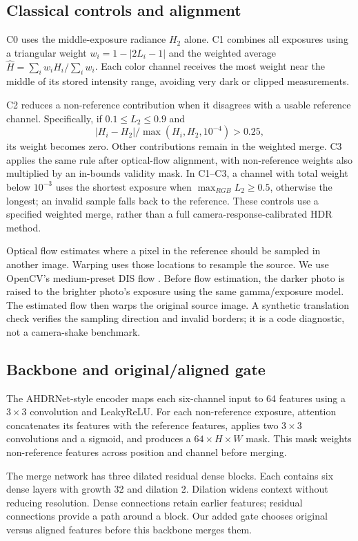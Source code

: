 \documentclass{article}
\begin{document}
\subsection{Classical controls and alignment}
C0 uses the middle-exposure radiance $H_2$ alone. C1 combines all exposures using a triangular weight $w_i=1-|2L_i-1|$ and the weighted average $\widehat H=\sum_i w_iH_i/\sum_i w_i$. Each color channel receives the most weight near the middle of its stored intensity range, avoiding very dark or clipped measurements.

C2 reduces a non-reference contribution when it disagrees with a usable reference channel. Specifically, if $0.1\leq L_2\leq0.9$ and
\begin{equation}
|H_i-H_2|/\max(H_i,H_2,10^{-4})>0.25,
\end{equation}
its weight becomes zero. Other contributions remain in the weighted merge. C3 applies the same rule after optical-flow alignment, with non-reference weights also multiplied by an in-bounds validity mask. In C1--C3, a channel with total weight below $10^{-3}$ uses the shortest exposure when $\max_{RGB}L_2\geq0.5$, otherwise the longest; an invalid sample falls back to the reference. These controls use a specified weighted merge, rather than a full camera-response-calibrated HDR method.

Optical flow estimates where a pixel in the reference should be sampled in another image. Warping uses those locations to resample the source. We use OpenCV's medium-preset DIS flow \citep{kroeger2016}. Before flow estimation, the darker photo is raised to the brighter photo's exposure using the same gamma/exposure model. The estimated flow then warps the original source image. A synthetic translation check verifies the sampling direction and invalid borders; it is a code diagnostic, not a camera-shake benchmark.

\subsection{Backbone and original/aligned gate}
The AHDRNet-style encoder maps each six-channel input to 64 features using a $3\times3$ convolution and LeakyReLU. For each non-reference exposure, attention concatenates its features with the reference features, applies two $3\times3$ convolutions and a sigmoid, and produces a $64\times H\times W$ mask. This mask weights non-reference features across position and channel before merging.

The merge network has three dilated residual dense blocks. Each contains six dense layers with growth 32 and dilation 2. Dilation widens context without reducing resolution. Dense connections retain earlier features; residual connections provide a path around a block. Our added gate chooses original versus aligned features before this backbone merges them.
\end{document}
